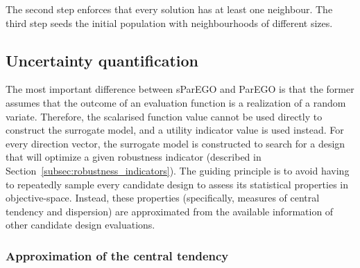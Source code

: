 \documentclass{llncs}
\begin{document}
The second step enforces that every solution has at least one neighbour. The third step seeds the initial population with neighbourhoods of different sizes.


\subsection{Uncertainty quantification}\label{subsec:uncertainty_quantification}

The most important difference between sParEGO and ParEGO is that the former assumes that the outcome of an evaluation function is a realization of a random variate. Therefore, the scalarised function value cannot be used directly to construct the surrogate model, and a utility indicator value is used instead. For every direction vector, the surrogate model is constructed to search for a design that will optimize a given robustness indicator (described in Section~\ref{subsec:robustness_indicators}). The guiding principle is to avoid having to repeatedly sample every candidate design to assess its statistical properties in objective-space. Instead, these properties (specifically, measures of central tendency and dispersion) are approximated from the available information of other candidate design evaluations.

\subsubsection{Approximation of the central tendency}
\end{document}
